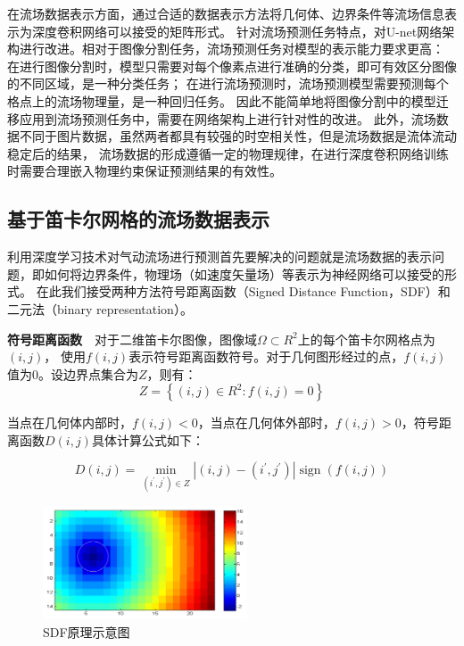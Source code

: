 在流场数据表示方面，通过合适的数据表示方法将几何体、边界条件等流场信息表示为深度卷积网络可以接受的矩阵形式。
针对流场预测任务特点，对U-net网络架构进行改进。相对于图像分割任务，流场预测任务对模型的表示能力要求更高：
在进行图像分割时，模型只需要对每个像素点进行准确的分类，即可有效区分图像的不同区域，是一种分类任务；
在进行流场预测时，流场预测模型需要预测每个格点上的流场物理量，是一种回归任务。
因此不能简单地将图像分割中的模型迁移应用到流场预测任务中，需要在网络架构上进行针对性的改进。
此外，流场数据不同于图片数据，虽然两者都具有较强的时空相关性，但是流场数据是流体流动稳定后的结果，
流场数据的形成遵循一定的物理规律，在进行深度卷积网络训练时需要合理嵌入物理约束保证预测结果的有效性。



\subsection{基于笛卡尔网格的流场数据表示}
利用深度学习技术对气动流场进行预测首先要解决的问题就是流场数据的表示问题，即如何将边界条件，物理场（如速度矢量场）等表示为神经网络可以接受的形式。
在此我们接受两种方法符号距离函数（Signed Distance Function，SDF）和二元法（binary representation）。


\textbf{符号距离函数}~~对于二维笛卡尔图像，图像域$\Omega \subset R^{2}$上的每个笛卡尔网格点为$(i, j)$，
使用$f(i, j)$表示符号距离函数符号。对于几何图形经过的点，$f(i, j)$值为0。设边界点集合为$Z$，则有：
\begin{equation}Z=\left\{(i, j) \in R^{2}: f(i, j)=0\right\}\end{equation}

当点在几何体内部时，$f(i, j) < 0$，当点在几何体外部时，$f(i, j) > 0$，符号距离函数$D(i, j)$具体计算公式如下：

\begin{equation}
D(i, j)=\min _{\left(i^{\prime}, j^{\prime}\right) \in Z}\left|(i, j)-\left(i^{\prime}, j^{\prime}\right)\right| \operatorname{sign}(f(i, j))
\end{equation}


\begin{figure}[htp]
	\centering
	\includegraphics[width=0.54\textwidth]{figures/sdf.png}
	\caption{SDF原理示意图}
	\label{fig:sdf}
\end{figure}

